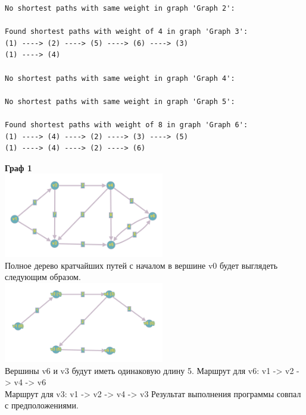 \documentclass[a4paper,14pt]{extarticle}
\begin{document}
\begin{enumerate}[1.]
\begin{verbatim}
No shortest paths with same weight in graph 'Graph 2':

Found shortest paths with weight of 4 in graph 'Graph 3':
(1) ----> (2) ----> (5) ----> (6) ----> (3)
(1) ----> (4)

No shortest paths with same weight in graph 'Graph 4':

No shortest paths with same weight in graph 'Graph 5':

Found shortest paths with weight of 8 in graph 'Graph 6':
(1) ----> (4) ----> (2) ----> (3) ----> (5)
(1) ----> (4) ----> (2) ----> (6)
                    \end{verbatim}
        
        \textbf{Граф 1}\\
        \includegraphics[width=70mm]{testTree1Before}\\
        Полное дерево кратчайших путей с началом в вершине v0 будет выглядеть следующим образом.\\
        \includegraphics[width=70mm]{testTree1After}\\
        Вершины v6 и v3 будут иметь одинаковую длину 5.\bigbreak
        Маршрут для v6: v1 -> v2 -> v4 -> v6\\
        Маршрут для v3: v1 -> v2 -> v4 -> v3\bigbreak
        Результат выполнения программы совпал с предположениями.\\


\end{enumerate}
\end{document}
